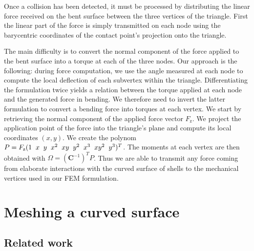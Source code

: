 \documentclass{llncs}
\begin{document}
Once a collision has been detected, it must be processed by distributing the linear force received on the bent surface between the three vertices of the triangle. First the linear part of the force is simply transmitted on each node using the barycentric coordinates of the contact point's projection onto the triangle. 

The main difficulty is to convert the normal component of the force applied to the bent surface into a torque at each of the three nodes. Our approach is the following: during force computation, we use the angle measured at each node to compute the local deflection of each subvertex within the triangle. Differentiating the formulation twice yields a relation between the torque applied at each node and the generated force in bending. We therefore need to invert the latter formulation to convert a bending force into torques at each vertex. We start by retrieving the normal component of the applied force vector $F_{\mathrm{z}}$. We project the application point of the force into the triangle's plane and compute its local coordinates $(x,y)$. We create the polynom $P = F_{\mathrm{z}}(1 \hspace{0.2cm} x \hspace{0.2cm} y \hspace{0.2cm} x^2 \hspace{0.2cm} xy \hspace{0.2cm} y^2 \hspace{0.2cm} x^3 \hspace{0.2cm} xy^2 \hspace{0.2cm} y^3)^T$. The moments at each vertex are then obtained with $\Omega = (\textbf{C}^{-1})^T P$.  Thus we are able to transmit any force coming from elaborate interactions with the curved surface of shells to the mechanical vertices used in our FEM formulation. 

\section{Meshing a curved surface}
\label{sec:mesh}
\subsection{Related work}
\end{document}
